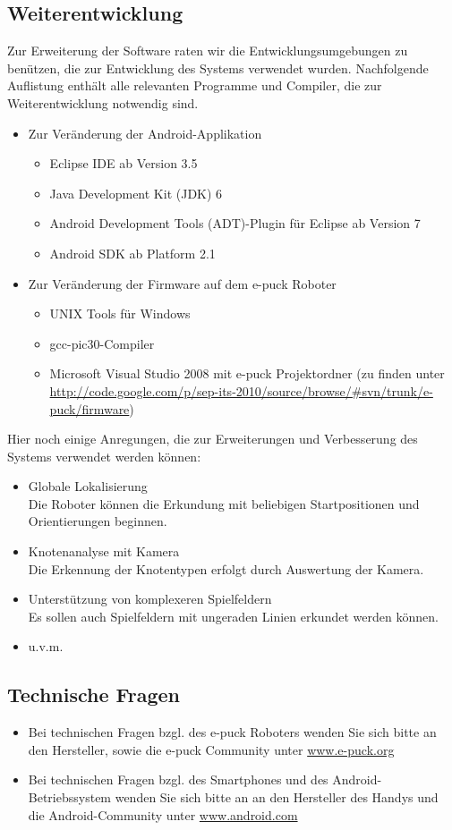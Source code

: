 \documentclass[10pt,a4paper]{article}
\begin{document}
	\subsection{Weiterentwicklung}
	Zur Erweiterung der Software raten wir die Entwicklungsumgebungen zu ben\"utzen, die zur Entwicklung des Systems verwendet wurden.
	Nachfolgende Auflistung enth\"alt alle relevanten Programme und Compiler, die zur Weiterentwicklung notwendig sind.
	\begin{itemize}
		\item{Zur Ver\"anderung der Android-Applikation}
		\begin{itemize}
			\item{Eclipse IDE ab Version 3.5}
			\item{Java Development Kit (JDK) 6}
			\item{Android Development Tools (ADT)-Plugin f\"ur Eclipse ab Version 7}
			\item{Android SDK ab Platform 2.1}
		\end{itemize}
		\item{Zur Ver\"anderung der Firmware auf dem e-puck Roboter}
		\begin{itemize}
			\item{UNIX Tools f\"ur Windows}
			\item{gcc-pic30-Compiler}
			\item{Microsoft Visual Studio 2008 mit e-puck Projektordner (zu finden unter \url{http://code.google.com/p/sep-its-2010/source/browse/#svn/trunk/e-
			puck/firmware})}
		\end{itemize}
	\end{itemize}
	Hier noch einige Anregungen, die zur Erweiterungen und Verbesserung des Systems verwendet werden k\"onnen:
	\begin{itemize}
		\item{Globale Lokalisierung} \\ Die Roboter k\"onnen die Erkundung mit beliebigen Startpositionen und Orientierungen beginnen.
		\item{Knotenanalyse mit Kamera} \\ Die Erkennung der Knotentypen erfolgt durch Auswertung der Kamera.
		\item{Unterst\"utzung von komplexeren Spielfeldern} \\ Es sollen auch Spielfeldern mit ungeraden Linien erkundet werden k\"onnen.
		\item{u.v.m.}
	\end{itemize}
	\subsection{Technische Fragen}
		\begin{itemize}
			\item{Bei technischen Fragen bzgl. des e-puck Roboters wenden Sie sich bitte an den Hersteller, sowie die e-puck Community unter
				\url{www.e-puck.org}}
			\item{Bei technischen Fragen bzgl. des Smartphones und des Android-Betriebssystem wenden Sie sich bitte an an den Hersteller des Handys
				und die Android-Community unter \url{www.android.com}}
		\end{itemize}
				 
		
\end{document}
